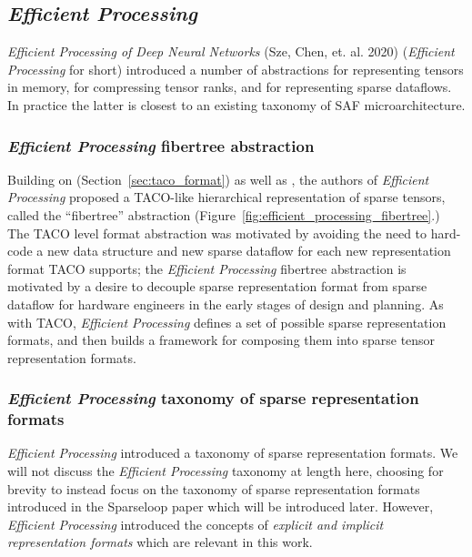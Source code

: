 \subsection{\textit{Efficient Processing}}

\textit{Efficient Processing of Deep Neural Networks}\cite{szebook} (Sze, Chen, et. al. 2020) (\textit{Efficient Processing} for short) introduced a number of abstractions for representing tensors in memory, for compressing tensor ranks, and for representing sparse dataflows. In practice the latter is closest to an existing taxonomy of SAF microarchitecture. 

\subsubsection{\textit{Efficient Processing} fibertree abstraction}

Building on \cite{taco_format} (Section~\ref{sec:taco_format}) as well as \cite{extensor}, the authors of \textit{Efficient Processing} proposed a TACO-like hierarchical representation of sparse tensors, called the ``fibertree'' abstraction (Figure~\ref{fig:efficient_processing_fibertree}.) The TACO level format abstraction was motivated by avoiding the need to hard-code a new data structure and new sparse dataflow for each new representation format TACO supports\cite{taco_format}; the \textit{Efficient Processing} fibertree abstraction is motivated by a desire to decouple sparse representation format from sparse dataflow for hardware engineers in the early stages of design and planning\cite{szebook}. As with TACO\cite{taco_format}, \textit{Efficient Processing} defines a set of possible sparse representation formats, and then builds a framework for composing them into sparse tensor representation formats.

\subsubsection{\textit{Efficient Processing} taxonomy of sparse representation formats}

\textit{Efficient Processing}\cite{szebook} introduced a taxonomy of sparse representation formats. We will not discuss the \textit{Efficient Processing} taxonomy at length here, choosing for brevity to instead focus on the taxonomy of sparse representation formats introduced in the Sparseloop\cite{sparseloop} paper which will be introduced later. However, \textit{Efficient Processing} introduced the concepts of \textit{explicit and implicit representation formats} which are relevant in this work.

